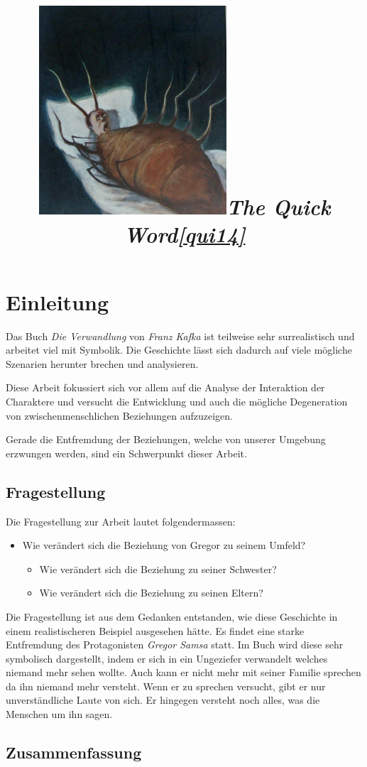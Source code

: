 \documentclass[12pt,a4paper,twoside,titlepage]{article}
\title{\includegraphics[width=7cm]{metamorphosis-kafka}\small\textit{\textcopyright The Quick Word\ref{qui14}}\huge\\\titleText}
\author{\authorText}
\date{\dateText}
\begin{document}
	\maketitle
	
	\tableofcontents
	
	\section{Einleitung}
	
	
	Das Buch \textit{Die Verwandlung} von \textit{Franz Kafka} ist teilweise sehr surrealistisch und arbeitet viel mit Symbolik. Die Geschichte lässt sich dadurch auf viele mögliche Szenarien herunter brechen und analysieren.
	
	Diese Arbeit fokussiert sich vor allem auf die Analyse der Interaktion der Charaktere und versucht die Entwicklung und auch die mögliche Degeneration von zwischenmenschlichen Beziehungen aufzuzeigen.
	
	Gerade die Entfremdung der Beziehungen, welche von unserer Umgebung erzwungen werden, sind ein Schwerpunkt dieser Arbeit.
	
	
	\subsection{Fragestellung}
	Die Fragestellung zur Arbeit lautet folgendermassen:
	\begin{itemize}
		\item Wie verändert sich die Beziehung von Gregor zu seinem Umfeld?
		\begin{itemize}
			\item Wie verändert sich die Beziehung zu seiner Schwester?
			\item Wie verändert sich die Beziehung zu seinen Eltern?
		\end{itemize}
	\end{itemize}
	
	Die Fragestellung ist aus dem Gedanken entstanden, wie diese Geschichte in einem realistischeren Beispiel ausgesehen hätte. Es findet eine starke Entfremdung des Protagonisten \textit{Gregor Samsa} statt. Im Buch wird diese sehr symbolisch dargestellt, indem er sich in ein Ungeziefer verwandelt welches niemand mehr sehen wollte. Auch kann er nicht mehr mit seiner Familie sprechen da ihn niemand mehr versteht. Wenn er zu sprechen versucht, gibt er nur unverständliche Laute von sich. Er hingegen versteht noch alles, was die Menschen um ihn sagen.
	
	\subsection{Zusammenfassung}
	
\end{document}

